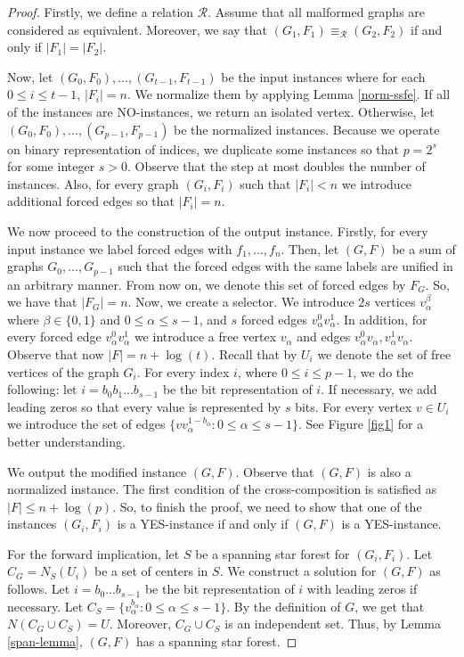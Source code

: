 \documentclass[en]{pracamgr}
\theoremstyle{definition}
\begin{document}
\begin{proof}
	Firstly, we define a relation $\mathcal{R}$. Assume that all malformed graphs are considered as equivalent. Moreover, we say that $(G_1,F_1) \equiv_\mathcal{R} (G_2,F_2)$ if and only if $|F_1|=|F_2|$.
	
	Now, let $(G_0,F_0),\ldots,(G_{t-1},F_{t-1})$ be the input instances where for each $0 \leq i \leq t-1$, $|F_i|=n$. We normalize them by applying Lemma \ref{norm-ssfe}. If all of the instances are NO-instances, we return an isolated vertex. Otherwise, let $(G_0,F_0),\ldots,(G_{p-1},F_{p-1})$ be the normalized instances. Because we operate on binary representation of indices, we duplicate some instances so that $p=2^s$ for some integer $s>0$. Observe that the step at most doubles the number of instances. Also, for every graph $(G_i,F_i)$ such that $|F_i| < n$ we introduce additional forced edges so that $|F_i|=n$.
	
	We now proceed to the construction of the output instance. Firstly, for every input instance we label forced edges with $f_1,...,f_n$. Then, let $(G,F)$ be a sum of graphs $G_0,...,G_{p-1}$ such that the forced edges with the same labels are unified in an arbitrary manner. From now on, we denote this set of forced edges by $F_G$. So, we have that $|F_G|=n$. Now, we create a selector. We introduce $2s$ vertices $v_\alpha^\beta$ where $\beta \in \{0,1\}$ and $0 \leq \alpha \leq s-1$, and $s$ forced edges $v_\alpha^0v_\alpha^1$. In addition, for every forced edge $v_\alpha^0v_\alpha^1$ we introduce a free vertex $v_\alpha$ and edges $v_\alpha^0v_\alpha,v_\alpha^1v_\alpha$. Observe that now $|F|= n + \log(t)$. Recall that by $U_i$ we denote the set of free vertices of the graph $G_i$. For every index $i$, where $0 \leq i \leq p-1$, we do the following: let $i=b_0b_1...b_{s-1}$ be the bit representation of $i$. If necessary, we add leading zeros so that every value is represented by $s$ bits. For every vertex $v \in U_i$ we introduce the set of edges $\{vv^{1-b_\alpha}_\alpha: 0 \leq \alpha \leq s-1\}$. See Figure \ref{fig1} for a better understanding.
	
	We output the modified instance $(G,F)$. Observe that $(G,F)$ is also a normalized instance. The first condition of the cross-composition is satisfied as $|F| \leq n + \log(p)$. So, to finish the proof, we need to show that one of the instances $(G_i,F_i)$ is a YES-instance if and only if $(G,F)$ is a YES-instance.
	
	For the forward implication, let $S$ be a spanning star forest for $(G_i,F_i)$. Let $C_G = N_S(U_i)$ be a set of centers in $S$. We construct a solution for $(G,F)$ as follows. Let $i=b_0...b_{s-1}$ be the bit representation of $i$ with leading zeros if necessary. Let $C_S = \{v_{\alpha}^{b_\alpha}: 0 \leq \alpha \leq s-1\}$. By the definition of $G$, we get that $N(C_G \cup C_S) = U$. Moreover, $C_G \cup C_S$ is an independent set. Thus, by Lemma \ref{span-lemma}, $(G,F)$ has a spanning star forest.
	

\end{proof}
\end{document}
